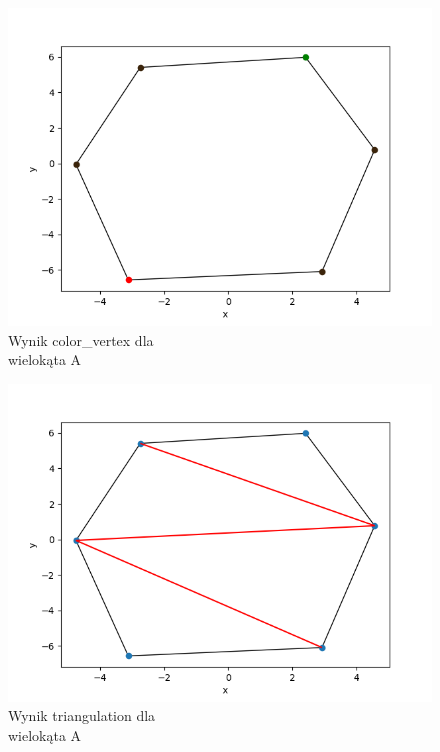 \documentclass[11pt,a4paper]{article}
\begin{document}
\begin{minipage}{0.46\textwidth}
    \begin{figure}[H]
        \centering
        \includegraphics[scale=0.5]{res/pol_a_colors.png}
        \caption{Wynik \ttfamily color\_vertex \normalfont dla \\wielokąta A}
    \end{figure}
\end{minipage}
\begin{minipage}{0.46\textwidth}
    \begin{figure}[H]
        \centering
        \includegraphics[scale=0.5]{res/pol_a_tri.png}
        \caption{Wynik \ttfamily triangulation \normalfont dla \\wielokąta A}
    \end{figure}
\end{minipage}
\end{document}
